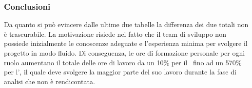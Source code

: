 	\subsubsection{Conclusioni}
	Da quanto si può evincere dalle ultime due tabelle la differenza dei due totali non è trascurabile. La motivazione risiede nel fatto che il team di sviluppo non possiede inizialmente le conoscenze adeguate e l'esperienza minima per svolgere il progetto in modo fluido. Di conseguenza, le ore di formazione personale per ogni ruolo aumentano il totale delle ore di lavoro da un 10\% per il \Progr\ fino ad un 570\% per l'\Ana, il quale deve svolgere la maggior parte del suo lavoro durante la fase di analisi che non è rendicontata. 